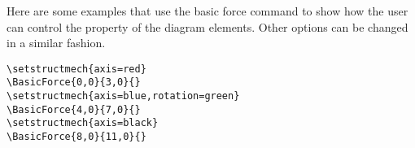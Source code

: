 \documentclass[10pt,a4paper]{article}
\begin{document}
Here are some examples that use the basic force command to show how the user can control the property of the diagram elements. Other options can be changed in a similar fashion.
\begin{Verbatim}[frame=single,label=Example]
\setstructmech{axis=red}
\BasicForce{0,0}{3,0}{}
\setstructmech{axis=blue,rotation=green}
\BasicForce{4,0}{7,0}{}
\setstructmech{axis=black}
\BasicForce{8,0}{11,0}{}
\end{Verbatim}
\begin{figure}[H]
\centering
{}
\end{figure}
\end{document}
